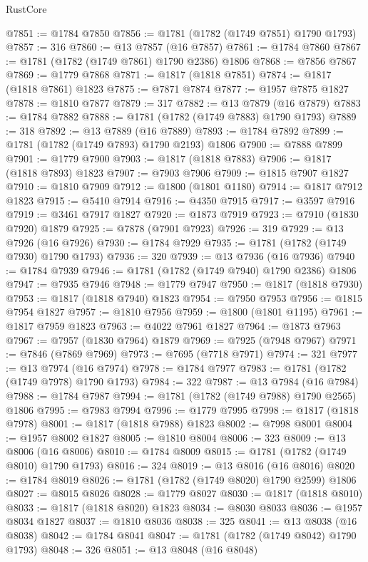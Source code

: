 \begin{lexlean}{RustCore}
\begin{coremodule}
@7851 := @1784 @7850
@7856 := @1781 (@1782 (@1749 @7851) @1790 @1793)
@7857 := 316
@7860 := @13 @7857 (@16 @7857)
@7861 := @1784 @7860
@7867 := @1781 (@1782 (@1749 @7861) @1790 @2386) @1806
@7868 := @7856 @7867
@7869 := @1779 @7868
@7871 := @1817 (@1818 @7851)
@7874 := @1817 (@1818 @7861) @1823
@7875 := @7871 @7874
@7877 := @1957 @7875 @1827
@7878 := @1810 @7877
@7879 := 317
@7882 := @13 @7879 (@16 @7879)
@7883 := @1784 @7882
@7888 := @1781 (@1782 (@1749 @7883) @1790 @1793)
@7889 := 318
@7892 := @13 @7889 (@16 @7889)
@7893 := @1784 @7892
@7899 := @1781 (@1782 (@1749 @7893) @1790 @2193) @1806
@7900 := @7888 @7899
@7901 := @1779 @7900
@7903 := @1817 (@1818 @7883)
@7906 := @1817 (@1818 @7893) @1823
@7907 := @7903 @7906
@7909 := @1815 @7907 @1827
@7910 := @1810 @7909
@7912 := @1800 (@1801 @1180)
@7914 := @1817 @7912 @1823
@7915 := @5410 @7914
@7916 := @4350 @7915
@7917 := @3597 @7916
@7919 := @3461 @7917 @1827
@7920 := @1873 @7919
@7923 := @7910 (@1830 @7920) @1879
@7925 := @7878 (@7901 @7923)
@7926 := 319
@7929 := @13 @7926 (@16 @7926)
@7930 := @1784 @7929
@7935 := @1781 (@1782 (@1749 @7930) @1790 @1793)
@7936 := 320
@7939 := @13 @7936 (@16 @7936)
@7940 := @1784 @7939
@7946 := @1781 (@1782 (@1749 @7940) @1790 @2386) @1806
@7947 := @7935 @7946
@7948 := @1779 @7947
@7950 := @1817 (@1818 @7930)
@7953 := @1817 (@1818 @7940) @1823
@7954 := @7950 @7953
@7956 := @1815 @7954 @1827
@7957 := @1810 @7956
@7959 := @1800 (@1801 @1195)
@7961 := @1817 @7959 @1823
@7963 := @4022 @7961 @1827
@7964 := @1873 @7963
@7967 := @7957 (@1830 @7964) @1879
@7969 := @7925 (@7948 @7967)
@7971 := @7846 (@7869 @7969)
@7973 := @7695 (@7718 @7971)
@7974 := 321
@7977 := @13 @7974 (@16 @7974)
@7978 := @1784 @7977
@7983 := @1781 (@1782 (@1749 @7978) @1790 @1793)
@7984 := 322
@7987 := @13 @7984 (@16 @7984)
@7988 := @1784 @7987
@7994 := @1781 (@1782 (@1749 @7988) @1790 @2565) @1806
@7995 := @7983 @7994
@7996 := @1779 @7995
@7998 := @1817 (@1818 @7978)
@8001 := @1817 (@1818 @7988) @1823
@8002 := @7998 @8001
@8004 := @1957 @8002 @1827
@8005 := @1810 @8004
@8006 := 323
@8009 := @13 @8006 (@16 @8006)
@8010 := @1784 @8009
@8015 := @1781 (@1782 (@1749 @8010) @1790 @1793)
@8016 := 324
@8019 := @13 @8016 (@16 @8016)
@8020 := @1784 @8019
@8026 := @1781 (@1782 (@1749 @8020) @1790 @2599) @1806
@8027 := @8015 @8026
@8028 := @1779 @8027
@8030 := @1817 (@1818 @8010)
@8033 := @1817 (@1818 @8020) @1823
@8034 := @8030 @8033
@8036 := @1957 @8034 @1827
@8037 := @1810 @8036
@8038 := 325
@8041 := @13 @8038 (@16 @8038)
@8042 := @1784 @8041
@8047 := @1781 (@1782 (@1749 @8042) @1790 @1793)
@8048 := 326
@8051 := @13 @8048 (@16 @8048)

\end{coremodule}
\end{lexlean}
